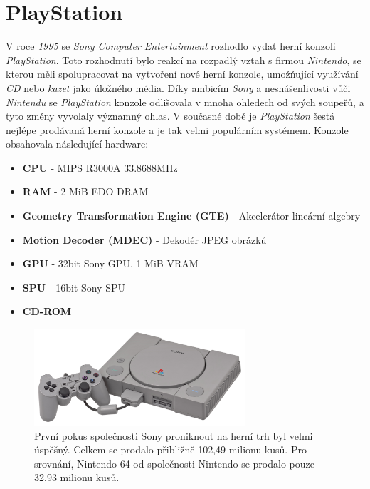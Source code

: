 \chapter{PlayStation}

V roce \textit{1995} se \textit{Sony Computer Entertainment} rozhodlo vydat herní konzoli \textit{PlayStation}. 
Toto rozhodnutí bylo reakcí na rozpadlý vztah s firmou \textit{Nintendo}, se kterou měli spolupracovat na 
vytvoření nové herní konzole, umožňující využívání \textit{CD} nebo \textit{kazet} jako úložného média. 
Díky ambicím \textit{Sony} a nesnášenlivosti vůči \textit{Nintendu} se \textit{PlayStation} konzole 
odlišovala v mnoha ohledech od svých soupeřů, a tyto změny vyvolaly významný ohlas. V současné době 
je \textit{PlayStation} šestá nejlépe prodávaná herní konzole a je tak velmi populárním systémem. 
Konzole obsahovala následující hardware:

\begin{itemize}
\label{Specifikace Hardwaru}
\item{\textbf{CPU} - MIPS R3000A 33.8688MHz}
\item{\textbf{RAM} - 2 MiB EDO DRAM}
\item{\textbf{Geometry Transformation Engine (GTE)} - Akcelerátor lineární algebry}
\item{\textbf{Motion Decoder (MDEC)} - Dekodér JPEG obrázků}
\item{\textbf{GPU} - 32bit Sony GPU, 1 MiB VRAM}
\item{\textbf{SPU} - 16bit Sony SPU}
\item{\textbf{CD-ROM}}
\end{itemize}

\begin{figure}[hbt]
\centering
\includegraphics[width=0.7\textwidth]{obrazky-figures/psx-console.jpg}
\caption{První pokus společnosti Sony proniknout na herní trh byl velmi úspěšný. Celkem se prodalo přibližně 102,49 milionu kusů. Pro srovnání, Nintendo 64 od společnosti Nintendo se prodalo pouze 32,93 milionu kusů.}
\label{psx-console}
\end{figure}

